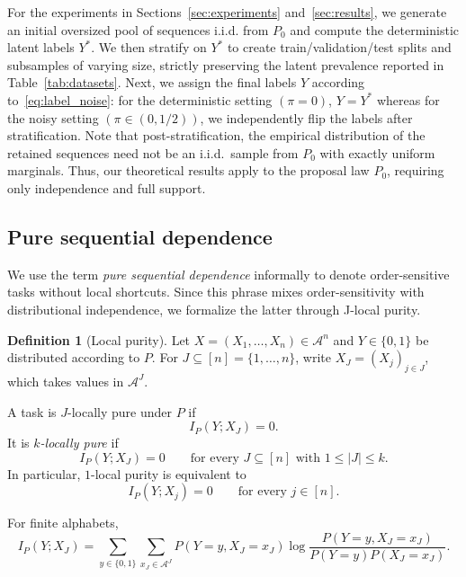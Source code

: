 \documentclass{article}
\theoremstyle{plain}
\theoremstyle{definition}
\newtheorem{definition}[theorem]{Definition}
\theoremstyle{remark}
\begin{document}
For the experiments in Sections~\ref{sec:experiments} and~\ref{sec:results}, we generate an initial oversized pool of sequences i.i.d. from $P_0$ and compute the deterministic latent labels $Y^*$. We then stratify on $Y^*$ to create train/validation/test splits and subsamples of varying size, strictly preserving the latent prevalence reported in Table~\ref{tab:datasets}. Next, we assign the final labels $Y$ according to~\eqref{eq:label_noise}: for the deterministic setting $(\pi = 0)$, $Y = Y^*$ whereas for the noisy setting $(\pi \in (0, 1/2))$, we independently flip the labels after stratification. Note that post-stratification, the empirical distribution of the retained sequences need not be an i.i.d.\ sample from $P_0$ with exactly uniform marginals. Thus, our theoretical results apply to the proposal law $P_0$, requiring only independence and full support.


\subsection{Pure sequential dependence}
\label{sec:pure_sequential_def}
We use the term \emph{pure sequential dependence} informally to denote order-sensitive tasks without local shortcuts. Since this phrase mixes order-sensitivity with distributional independence, we formalize the latter through J-local purity.


\begin{definition}[Local purity]
\label{def:local_purity}
Let \(X=(X_1,\ldots,X_n)\in\mathcal A^n\) and \(Y\in\{0,1\}\)
be distributed according to \(P\). For \(J\subseteq [n] = \{1, \ldots, n\}\), write
\(X_J=(X_j)_{j\in J}\), which takes values in \(\mathcal A^J\).

A task is \(J\)-locally pure under \(P\) if
\[
I_P(Y;X_J)=0.
\]
It is \emph{\(k\)-locally pure} if
\[
I_P(Y;X_J)=0
\qquad
\text{for every } J\subseteq [n] \text{ with } 1\le |J|\le k.
\]
In particular, \(1\)-local purity is equivalent to
\[
I_P(Y;X_j)=0
\qquad
\text{for every } j\in[n].
\]

For finite alphabets,
\[
I_P(Y;X_J)
=
\sum_{y\in\{0,1\}}
\sum_{x_J\in\mathcal A^J}
P(Y=y,X_J=x_J)
\log
\frac{
P(Y=y,X_J=x_J)
}{
P(Y=y)P(X_J=x_J)
}.
\]
\end{definition}
\end{document}
